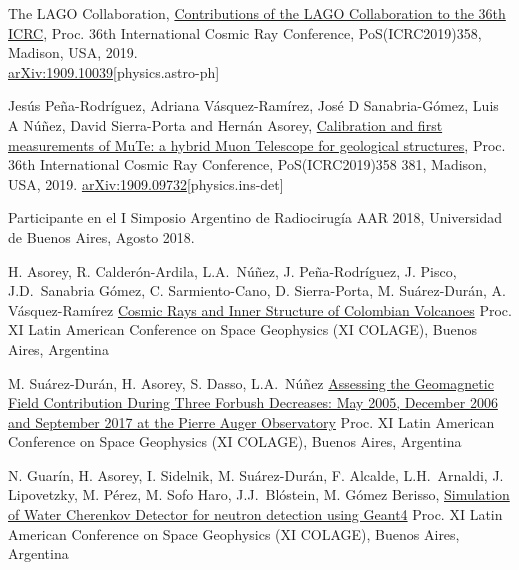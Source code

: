 \begin{etaremune}
\item {} The LAGO Collaboration, \href{https://arxiv.org/abs/1909.10039}{Contributions of the LAGO Collaboration to the 36th ICRC}, \en Proc.
36th International Cosmic Ray Conference, PoS(ICRC2019)358, Madison, USA, 2019.\\ \href{http://arxiv.org/abs/1909.10039}{arXiv:1909.10039}[physics.astro-ph]

\item {} Jesús Peña-Rodríguez, Adriana Vásquez-Ramírez, José D Sanabria-Gómez, Luis A Núñez, David Sierra-Porta and Hernán Asorey, \href{https://pos.sissa.it/358/381/}{Calibration and first measurements of MuTe: a hybrid Muon Telescope for geological structures}, \en Proc.
36th International Cosmic Ray Conference, PoS(ICRC2019)358 381, Madison, USA, 2019. \href{http://arxiv.org/abs/1909.09732}{arXiv:1909.09732}[physics.ins-det]

\item {} Participante en el I Simposio Argentino de Radiocirugía AAR 2018, Universidad de Buenos Aires, Agosto 2018. 

\item {} H. Asorey, R. Calderón-Ardila, L.A.\ Núñez, J. Peña-Rodríguez, J. Pisco, J.D.\ Sanabria Gómez, C. Sarmiento-Cano, D. Sierra-Porta, M. Suárez-Durán, A. Vásquez-Ramírez \href{}{{Cosmic Rays and Inner Structure of Colombian Volcanoes}} \en Proc.
XI Latin American Conference on Space Geophysics (XI COLAGE), Buenos Aires, Argentina %

\item {} M. Suárez-Durán, H. Asorey, S. Dasso, L.A.\ Núñez \href{}{{Assessing the Geomagnetic Field Contribution During Three Forbush Decreases: May 2005, December 2006 and September 2017 at the Pierre Auger Observatory}} \en Proc.
XI Latin American Conference on Space Geophysics (XI COLAGE), Buenos Aires, Argentina %

\item {} N. Guarín, H. Asorey, I. Sidelnik, M. Suárez-Durán, F. Alcalde, L.H.\ Arnaldi, J. Lipovetzky, M. Pérez, M. Sofo Haro, J.J.\ Blóstein, M. Gómez Berisso, \href{}{{Simulation of Water Cherenkov Detector for neutron detection using Geant4}} \en Proc.
XI Latin American Conference on Space Geophysics (XI COLAGE),  Buenos Aires, Argentina %


\end{etaremune}
